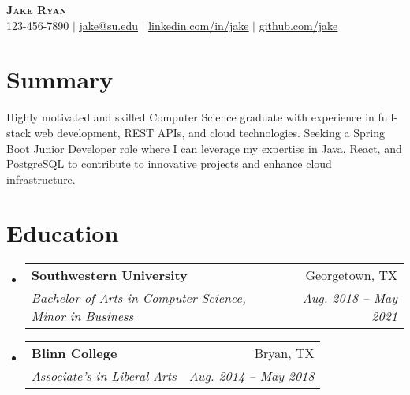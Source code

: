 \documentclass[letterpaper,11pt]{article}
\makeatletter
\newcommand{\resumeSubheading}[4]{
\vspace{-2pt}\item
\begin{tabular*}{0.97\textwidth}[t]{l@{\extracolsep{\fill}}r}
\textbf{#1} & #2 \\
\textit{\small#3} & \textit{\small #4} \\
\end{tabular*}\vspace{-7pt}
}
\newcommand{\resumeSubHeadingListStart}{\begin{itemize}[leftmargin=0.15in, label={}]}
\newcommand{\resumeSubHeadingListEnd}{\end{itemize}}
\makeatother
\begin{document}
\begin{center}
\textbf{\Huge \scshape Jake Ryan} \\ \vspace{1pt}
\small 123-456-7890 $|$ \href{mailto:jake@su.edu}{\underline{jake@su.edu}} $|$
\href{https://linkedin.com/in/jake}{\underline{linkedin.com/in/jake}} $|$
\href{https://github.com/jake}{\underline{github.com/jake}}
\end{center}


\section{Summary}
Highly motivated and skilled Computer Science graduate with experience in full-stack web development, REST APIs, and cloud technologies. Seeking a Spring Boot Junior Developer role where I can leverage my expertise in Java, React, and PostgreSQL to contribute to innovative projects and enhance cloud infrastructure.

\section{Education}
\resumeSubHeadingListStart
\resumeSubheading{Southwestern University}{Georgetown, TX}{Bachelor of Arts in Computer Science, Minor in Business}{Aug. 2018 – May 2021}
\resumeSubheading{Blinn College}{Bryan, TX}{Associate’s in Liberal Arts}{Aug. 2014 – May 2018}
\resumeSubHeadingListEnd
\end{document}
